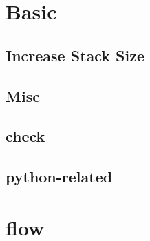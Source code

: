 \documentclass[a4paper,10pt,twocolumn,oneside]{article}
\begin{document}
\pagestyle{fancy}
\fancyfoot{}
\fancyhead[R]{\thepage}
\renewcommand{\headrulewidth}{0.4pt}
\renewcommand{\contentsname}{Contents} 

\scriptsize
\tableofcontents


\section{Basic}
% 

\subsection{Increase Stack Size}


% 

\subsection{Misc}


\subsection{check}


\subsection{python-related}


% 

\section{flow}
\end{document}
